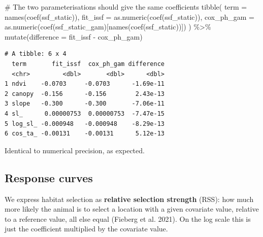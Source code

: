 \documentclass[
  letterpaper,
  DIV=11,
  numbers=noendperiod]{scrartcl}
\newenvironment{Shaded}{\begin{snugshade}}{\end{snugshade}}
\newcommand{\AttributeTok}[1]{\textcolor[rgb]{0.40,0.45,0.13}{#1}}
\newcommand{\CommentTok}[1]{\textcolor[rgb]{0.37,0.37,0.37}{#1}}
\newcommand{\FunctionTok}[1]{\textcolor[rgb]{0.28,0.35,0.67}{#1}}
\newcommand{\NormalTok}[1]{\textcolor[rgb]{0.00,0.23,0.31}{#1}}
\newcommand{\SpecialCharTok}[1]{\textcolor[rgb]{0.37,0.37,0.37}{#1}}
\begin{document}
\begin{Shaded}
\begin{Highlighting}[]
\CommentTok{\# The two parameterisations should give the same coefficients}
\FunctionTok{tibble}\NormalTok{(}
  \AttributeTok{term       =} \FunctionTok{names}\NormalTok{(}\FunctionTok{coef}\NormalTok{(ssf\_static)),}
  \AttributeTok{fit\_issf   =} \FunctionTok{as.numeric}\NormalTok{(}\FunctionTok{coef}\NormalTok{(ssf\_static)),}
  \AttributeTok{cox\_ph\_gam =} \FunctionTok{as.numeric}\NormalTok{(}\FunctionTok{coef}\NormalTok{(ssf\_static\_gam)[}\FunctionTok{names}\NormalTok{(}\FunctionTok{coef}\NormalTok{(ssf\_static))])}
\NormalTok{) }\SpecialCharTok{\%\textgreater{}\%}
  \FunctionTok{mutate}\NormalTok{(}\AttributeTok{difference =}\NormalTok{ fit\_issf }\SpecialCharTok{{-}}\NormalTok{ cox\_ph\_gam)}
\end{Highlighting}
\end{Shaded}

\begin{verbatim}
# A tibble: 6 x 4
  term       fit_issf  cox_ph_gam difference
  <chr>         <dbl>       <dbl>      <dbl>
1 ndvi    -0.0703     -0.0703      -1.69e-11
2 canopy  -0.156      -0.156        2.43e-13
3 slope   -0.300      -0.300       -7.06e-11
4 sl_      0.00000753  0.00000753  -7.47e-15
5 log_sl_ -0.000948   -0.000948    -8.29e-13
6 cos_ta_ -0.00131    -0.00131      5.12e-13
\end{verbatim}

Identical to numerical precision, as expected.

\subsection{Response curves}\label{response-curves}

We express habitat selection as \textbf{relative selection strength}
(RSS): how much more likely the animal is to select a location with a
given covariate value, relative to a reference value, all else equal
(Fieberg et al. 2021). On the log scale this is just the coefficient
multiplied by the covariate value.
\end{document}

